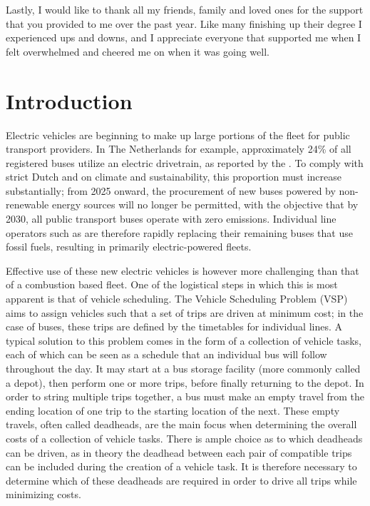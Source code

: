 \documentclass[]{article}
\begin{document}
Lastly, I would like to thank all my friends, family and loved ones for the support that you provided to me over the past year. Like many finishing up their degree I experienced ups and downs, and I appreciate everyone that supported me when I felt overwhelmed and cheered me on when it was going well.

\newpage
\tableofcontents
\newpage

\section{Introduction}
Electric vehicles are beginning to make up large portions of the fleet for public transport providers. In The Netherlands for example, approximately 24\% of all registered buses utilize an electric drivetrain, as reported by the \citet{RDW}. To comply with strict Dutch and \citet{europaRegulation20181999} on climate and sustainability, this proportion must increase substantially; from 2025 onward, the procurement of new buses powered by non-renewable energy sources will no longer be permitted, with the objective that by 2030, all public transport buses operate with zero emissions. Individual line operators such as \citet{qbuzzQbuzz} are therefore rapidly replacing their remaining buses that use fossil fuels, resulting in primarily electric-powered fleets.

Effective use of these new electric vehicles is however more challenging than that of a combustion based fleet. One of the logistical steps in which this is most apparent is that of vehicle scheduling. The Vehicle Scheduling Problem (VSP) aims to assign vehicles such that a set of trips are driven at minimum cost; in the case of buses, these trips are defined by the timetables for individual lines. A typical solution to this problem comes in the form of a collection of vehicle tasks, each of which can be seen as a schedule that an individual bus will follow throughout the day. It may start at a bus storage facility (more commonly called a depot), then perform one or more trips, before finally returning to the depot. In order to string multiple trips together, a bus must make an empty travel from the ending location of one trip to the starting location of the next. These empty travels, often called deadheads, are the main focus when determining the overall costs of a collection of vehicle tasks. There is ample choice as to which deadheads can be driven, as in theory the deadhead between each pair of compatible trips can be included during the creation of a vehicle task. It is therefore necessary to determine which of these deadheads are required in order to drive all trips while minimizing costs.
\end{document}
